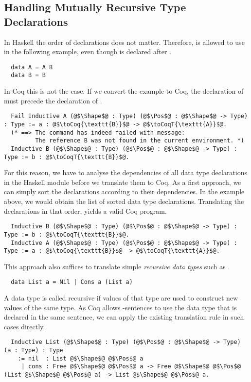 \subsection{Handling Mutually Recursive Type Declarations} \label{sec:translation:type-decl:rec}
In Haskell the order of declarations does not matter.
Therefore,  is allowed to use  in the following example, even though  is declared after .
\begin{verbatim}
  data A = A B
  data B = B
\end{verbatim}
In Coq this is not the case.
If we convert the example to Coq, the declaration of  must precede the declaration of .
\begin{verbatim}
  Fail Inductive A (@$\Shape$@ : Type) (@$\Pos$@ : @$\Shape$@ -> Type) : Type := a : @$\toCoq{\texttt{B}}$@ -> @$\toCoqT{\texttt{A}}$@.
  (* ==> The command has indeed failed with message:
         The reference B was not found in the current environment. *)
  Inductive B (@$\Shape$@ : Type) (@$\Pos$@ : @$\Shape$@ -> Type) : Type := b : @$\toCoqT{\texttt{B}}$@.
\end{verbatim}
For this reason, we have to analyse the dependencies of all data type declarations in the Haskell module before we translate them to Coq.
As a first approach, we can simply sort the declarations according to their dependencies.
In the example above, we would obtain the list \haskell{[B, A]} of sorted data type declarations.
Translating the declarations in that order, yields a valid Coq program.
\begin{verbatim}
  Inductive B (@$\Shape$@ : Type) (@$\Pos$@ : @$\Shape$@ -> Type) : Type := b : @$\toCoqT{\texttt{B}}$@.
  Inductive A (@$\Shape$@ : Type) (@$\Pos$@ : @$\Shape$@ -> Type) : Type := a : @$\toCoq{\texttt{B}}$@ -> @$\toCoqT{\texttt{A}}$@.
\end{verbatim}

This approach also suffices to translate simple \textit{recursive data types} such as .
\begin{verbatim}
  data List a = Nil | Cons a (List a)
\end{verbatim}
A data type is called recursive if values of that type are used to construct new values of the same type.
As Coq allows -sentences to use the data type that is declared in the same sentence, we can apply the existing translation rule in such cases directly.
\begin{verbatim}
  Inductive List (@$\Shape$@ : Type) (@$\Pos$@ : @$\Shape$@ -> Type) (a : Type) : Type
    := nil  : List @$\Shape$@ @$\Pos$@ a
     | cons : Free @$\Shape$@ @$\Pos$@ a -> Free @$\Shape$@ @$\Pos$@ (List @$\Shape$@ @$\Pos$@ a) -> List @$\Shape$@ @$\Pos$@ a.
\end{verbatim}

